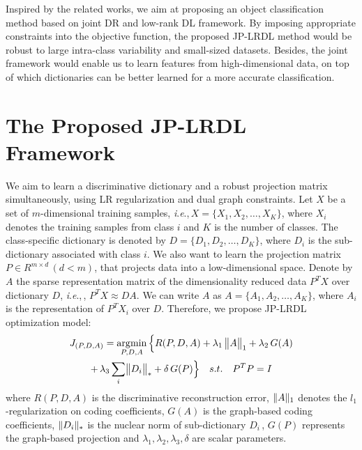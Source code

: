 \documentclass[journal]{IEEEtran}
\newcommand{\ie}{\textit{i}.\textit{e}.,\,}
\DeclareMathOperator*{\argmin}{\arg\!\min}
\DeclarePairedDelimiter\norm{\lVert}{\rVert}
\begin{document}
Inspired by the related works, we aim at proposing an object classification method based on joint DR and low-rank DL framework. By imposing appropriate constraints into the objective function, the proposed JP-LRDL method would be robust to large intra-class variability and small-sized datasets. Besides, the joint framework would enable us to learn features from high-dimensional data, on top of which dictionaries can be better learned for a more accurate classification.
\section{The Proposed JP-LRDL Framework}
\label{sec:proposed}
We aim to learn a discriminative dictionary and a robust projection matrix simultaneously, using LR regularization and dual graph constraints. 
Let $X$ be a set of $m$-dimensional training samples, \ie $X=\{ X_1, X_2, \dots , X_K \}$, where $X_i$ denotes the training samples from class $i$ and $K$ is the number of classes. The class-specific dictionary is denoted by $D=\{ D_1, D_2, \dots , D_K \}$, where $D_i$ is the sub-dictionary associated with class $i$. 
We also want to learn the projection matrix $P \in R^{m \times d} \, (d<m)$, that projects data into a low-dimensional space. Denote by $A$ the sparse representation matrix of the dimensionality reduced data $P^T X$ over dictionary $D$, \ie, $P^T X \approx DA$. We can write $A$ as $A=\{ A_1, A_2, \dots , A_K \}$, where $A_i$ is the representation of $P^T X_i$ over $D$. Therefore, we propose JP-LRDL optimization model:
\begin{gather}
J_{(P,D,A)} = \argmin_{P,D,A} \Big\{ R(P,D,A) + \lambda_{1} \, \norm[\big]{A}_{1} + \lambda_{2} \, G(A)   
\label{eq1} \\ \notag
+ \, \lambda_{3} \sum\limits_{i}  \norm[\big]{D_i}_{*}  +  \delta \, G(P) \Big\} \quad s.t. \quad P^TP=I
\end{gather}
where $R(P,D,A)$ is the discriminative reconstruction error, $\norm{A}_{1}$ denotes the $l_1$-regularization on coding coefficients, $G(A)$ is the graph-based coding coefficients, $\norm{D_i}_{*}$ is the nuclear norm of sub-dictionary $D_i \,$, $G(P)$ represents the graph-based projection and $\lambda_{1}, \lambda_{2}, \lambda_{3}, \delta$ are scalar parameters. %
\end{document}
